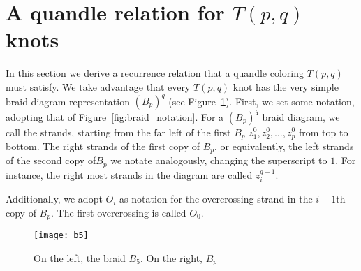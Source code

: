 \documentclass[paper.tex]{subfiles}
\begin{document}

\section{A quandle relation for $T(p,q)$ knots}

In this section we derive a recurrence relation that a quandle coloring $T(p,q)$ must satisfy. We take advantage that every $T(p,q)$ knot has the very simple braid diagram representation $(B_p)^q$ (see Figure~\ref{fig:bp}). First,
we set some notation, adopting that of Figure~\ref{fig:braid_notation}. For a $(B_p)^q$ braid diagram, we call the strands, starting from the far left of the first $B_p$ $z^0_1, z^0_2, \ldots, z^0_p$ from top to bottom.
The right strands of the first copy of $B_p$, or equivalently, the left strands of the second copy of$B_p$ we notate analogously, changing the superscript to $1$. For instance, the right most strands in the diagram are called $z^{q - 1}_i$.

Additionally, we adopt $O_i$ as notation for the overcrossing strand in the $i - 1$th copy of $B_p$. The first overcrossing is called $O_0$.

\begin{figure}[h]
  \centering
  \texttt{[image: b5]}
  \caption{On the left, the braid $B_5$. On the right, $B_p$}\label{fig:bp}
\end{figure}
\end{document}
